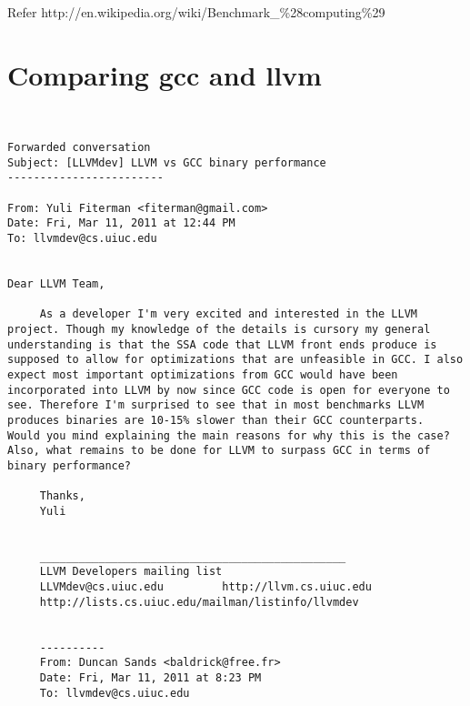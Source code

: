 \documentclass[a4paper,10pt]{article}
\begin{document}
Refer http://en.wikipedia.org/wiki/Benchmark\_\%28computing\%29
\section{Comparing gcc and llvm}

\begin{verbatim}


Forwarded conversation
Subject: [LLVMdev] LLVM vs GCC binary performance
------------------------

From: Yuli Fiterman <fiterman@gmail.com>
Date: Fri, Mar 11, 2011 at 12:44 PM
To: llvmdev@cs.uiuc.edu


Dear LLVM Team,

     As a developer I'm very excited and interested in the LLVM project. Though my knowledge of the details is cursory my general understanding is that the SSA code that LLVM front ends produce is supposed to allow for optimizations that are unfeasible in GCC. I also expect most important optimizations from GCC would have been incorporated into LLVM by now since GCC code is open for everyone to see. Therefore I'm surprised to see that in most benchmarks LLVM produces binaries are 10-15% slower than their GCC counterparts.  Would you mind explaining the main reasons for why this is the case? Also, what remains to be done for LLVM to surpass GCC in terms of binary performance?

     Thanks,
     Yuli
      

     _______________________________________________
     LLVM Developers mailing list
     LLVMdev@cs.uiuc.edu         http://llvm.cs.uiuc.edu
     http://lists.cs.uiuc.edu/mailman/listinfo/llvmdev


     ----------
     From: Duncan Sands <baldrick@free.fr>
     Date: Fri, Mar 11, 2011 at 8:23 PM
     To: llvmdev@cs.uiuc.edu



\end{verbatim}
\end{document}
